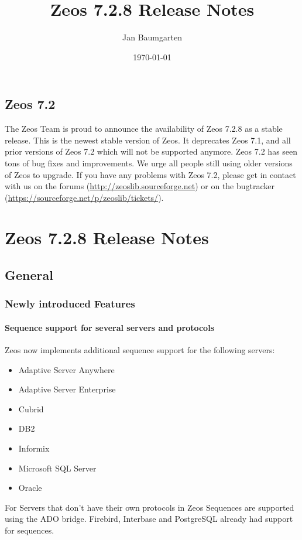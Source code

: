 \documentclass[a4paper,12pt,oneside]{book}
\title{Zeos 7.2.8 Release Notes}
\author{Jan Baumgarten}
\date{\today}
\begin{document}
\maketitle
\tableofcontents

\section*{Zeos 7.2}
The Zeos Team is proud to announce the availability of Zeos 7.2.8 as a stable release.
This is the newest stable version of Zeos.
It deprecates Zeos 7.1, and all prior versions of Zeos 7.2 which will not be supported anymore.
Zeos 7.2 has seen tons of bug fixes and improvements.
We urge all people still using older versions of Zeos to upgrade.
If you have any problems with Zeos 7.2, please get in contact with us on the forums (\url{http://zeoslib.sourceforge.net}) or on the bugtracker (\url{https://sourceforge.net/p/zeoslib/tickets/}).

\chapter{Zeos 7.2.8 Release Notes}

\section{General}
\label{sec:Rev8_General}

\subsection{Newly introduced Features}
\label{sec:Rev8_General_Features}

\subsubsection{Sequence support for several servers and protocols}
\label{sec:Rev8_General_Features_Sequences}
Zeos now implements additional sequence support for the following servers:
\begin{itemize}
\item Adaptive Server Anywhere
\item Adaptive Server Enterprise
\item Cubrid
\item DB2
\item Informix
\item Microsoft SQL Server
\item Oracle
\end{itemize}
For Servers that don't have their own protocols in Zeos Sequences are supported using the ADO bridge.
Firebird, Interbase and PostgreSQL already had support for sequences.
\end{document}
